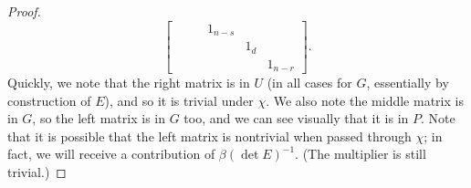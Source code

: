 \begin{proof}
\[\begin{bmatrix}
		&&& 1_{n-s} \\ &&&& 1_d \\ &&&&& 1_{n-r}
	\end{bmatrix}.\]
	Quickly, we note that the right matrix is in $U$ (in all cases for $G$, essentially by construction of $E$), and so it is trivial under $\chi$. We also note the middle matrix is in $G$, so the left matrix is in $G$ too, and we can see visually that it is in $P$.
    Note that it is possible that the left matrix is nontrivial when passed through $\chi$; in fact, we will receive a contribution of $\beta(\det E)^{-1}$. (The multiplier is still trivial.)
	

\end{proof}
